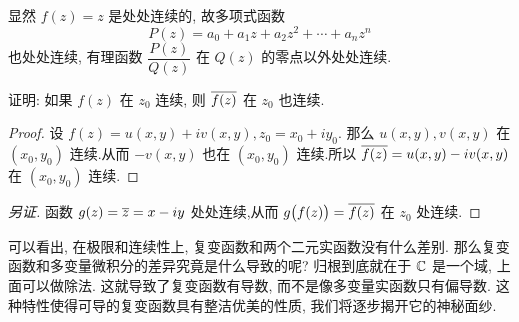 显然 $f(z)=z$ 是处处连续的, 故多项式函数
\[P(z)=a_0+a_1z+a_2z^2+\cdots+a_nz^n\]
也处处连续, 有理函数 $\dfrac{P(z)}{Q(z)}$ 在 $Q(z)$ 的零点以外处处连续.

\begin{example}
  证明: 如果 $f(z)$ 在 $z_0$ 连续, 则 $\overline{f(z)}$ 在 $z_0$ 也连续.
\end{example}

\begin{proof}
  设 $f(z)=u(x,y)+iv(x,y),z_0=x_0+iy_0$.
  那么 $u(x,y),v(x,y)$ 在 $(x_0,y_0)$ 连续.从而 $-v(x,y)$ 也在 $(x_0,y_0)$ 连续.所以 $\overline{f(z)}=u(x,y)-iv(x,y)$ 在 $(x_0,y_0)$ 连续.
\end{proof}
\begin{proof}[另证]
  函数 $g(z)=\overline z=x-iy$ 处处连续,从而 $g\bigl(f(z)\bigr)=\overline{f(z)}$ 在 $z_0$ 处连续.
\end{proof}

可以看出, 在极限和连续性上, 复变函数和两个二元实函数没有什么差别.
那么复变函数和多变量微积分的差异究竟是什么导致的呢?
归根到底就在于 ${\mathbb{C}}$ 是一个域, 上面可以做除法.
这就导致了复变函数有\alert{导数}, 而不是像多变量实函数只有偏导数.
这种特性使得可导的复变函数具有整洁优美的性质, 我们将逐步揭开它的神秘面纱.


